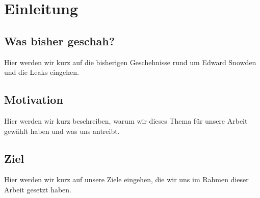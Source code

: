 \section{Einleitung}

\subsection{Was bisher geschah?}
Hier werden wir kurz auf die bisherigen Geschehnisse rund um Edward Snowden und die Leaks eingehen.

\subsection{Motivation}
Hier werden wir kurz beschreiben, warum wir dieses Thema für unsere Arbeit gewählt haben und was uns antreibt.

\subsection{Ziel}
Hier werden wir kurz auf unsere Ziele eingehen, die wir uns im Rahmen dieser Arbeit gesetzt haben.
